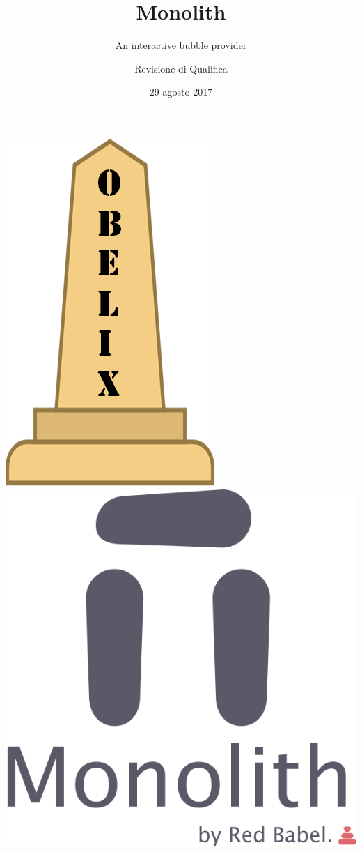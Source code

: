 \documentclass[RawSienna,dvipsnames]{beamer}
\title{Monolith}
\subtitle{An interactive bubble provider}
\author{Revisione di Qualifica}
\date{29 agosto 2017}
\begin{document}
	
\begin{frame}
	\begin{center}
		\includegraphics[scale=0.13]{img/obelix.png}
		\qquad\qquad
		\includegraphics[scale=0.13]{img/monolith.png}
	\end{center}
	\titlepage
\end{frame}
\end{document}

